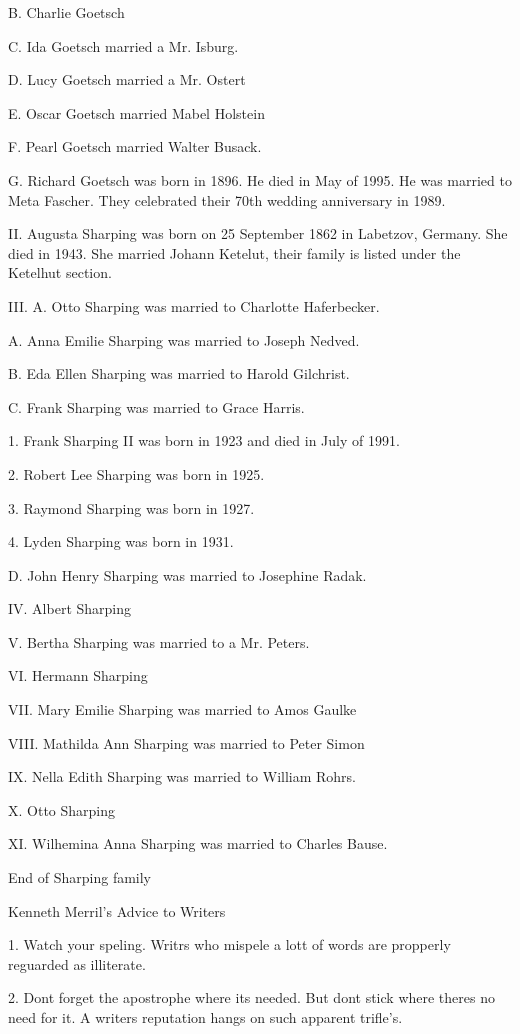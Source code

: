 \documentclass[a4paper]{article}
\begin{document}
B. Charlie Goetsch

C. Ida Goetsch married a Mr. Isburg.

D. Lucy Goetsch married a Mr. Ostert

E. Oscar Goetsch married  Mabel Holstein

F. Pearl Goetsch married Walter Busack.

G. Richard Goetsch was born in 1896.  He died in May of 1995.  He was married to Meta Fascher.  They celebrated their 70th wedding anniversary in 1989. 

II. Augusta Sharping was born on 25 September 1862 in Labetzov, Germany.  She died in 1943.  She married Johann Ketelut, their family is listed under the Ketelhut section.

III. A. Otto  Sharping was married to Charlotte Haferbecker.

A. Anna Emilie Sharping was married to Joseph Nedved.

B. Eda Ellen Sharping was married to Harold Gilchrist.  

C. Frank Sharping was married to Grace Harris.

1. Frank Sharping II was born in 1923 and died in July of 1991.

2. Robert Lee Sharping was born in 1925.

3. Raymond Sharping was born in 1927.

4. Lyden Sharping was born in 1931.

D. John Henry Sharping was married to Josephine Radak.

IV. Albert Sharping

V. Bertha Sharping was married to a Mr. Peters.

VI. Hermann Sharping

VII. Mary Emilie Sharping was married to Amos Gaulke

VIII. Mathilda Ann Sharping was married to Peter Simon

IX. Nella Edith Sharping was married to William Rohrs.

X. Otto Sharping

XI.  Wilhemina Anna Sharping was married to Charles Bause.

\vskip 4mm
End of Sharping family
\pagebreak

{\Huge \noindent Kenneth Merril's Advice to Writers}
\vskip 5mm


1. Watch your speling.  Writrs who mispele a lott of words are propperly reguarded as illiterate.

2. Dont forget the apostrophe where its needed.  But dont stick where theres no need for it. A writers reputation hangs on such apparent trifle's.  
\end{document}
